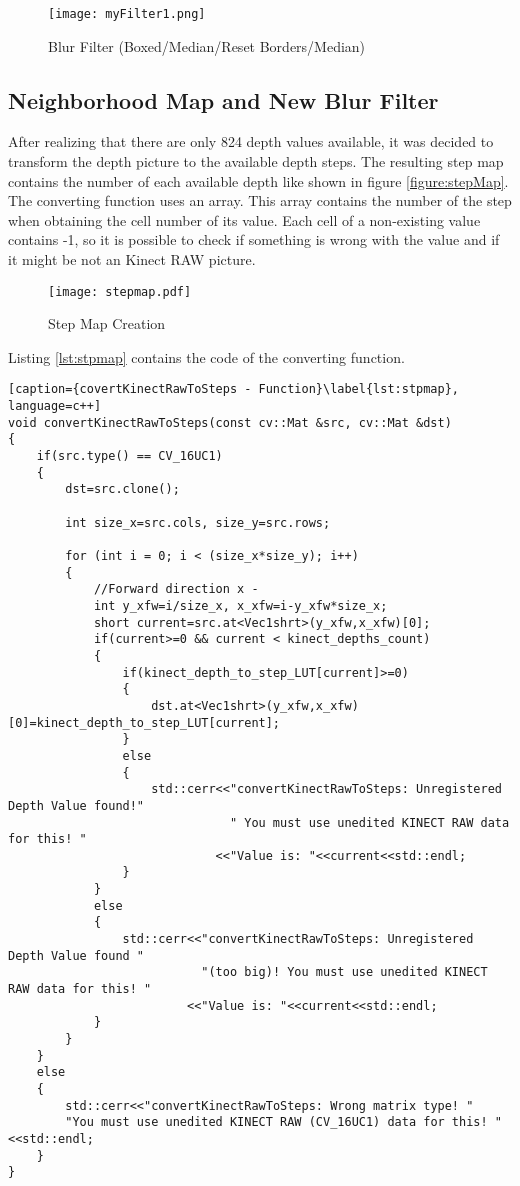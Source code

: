 \begin{figure}[htp]
\begin{center}
  \texttt{[image: myFilter1.png]}
  \caption{Blur Filter (Boxed/Median/Reset Borders/Median)}
  \label{figure:blur}
\end{center}
\end{figure}
\clearpage

\subsection{Neighborhood Map and New Blur Filter} \label{sect:blurFilter} 
After realizing that there are only 824 depth values available, it was decided to transform the depth picture
to the available depth steps. The resulting step map contains the number of each available depth like 
shown in figure \vref{figure:stepMap}. The converting function uses an array. This array contains the number of the
step when obtaining the cell number of its value. Each cell of a non-existing value contains -1, so it is
possible to check if something is wrong with the value and if it might be not an Kinect RAW picture. 

\begin{figure}[htp]
\begin{center}
  \texttt{[image: stepmap.pdf]}
  \caption{Step Map Creation}
  \label{figure:stepMap}
\end{center}
\end{figure}

Listing \vref{lst:stpmap} contains the code of the converting function.

\begin{lstlisting}[caption={covertKinectRawToSteps - Function}\label{lst:stpmap}, language=c++]
void convertKinectRawToSteps(const cv::Mat &src, cv::Mat &dst)
{
	if(src.type() == CV_16UC1)
	{
		dst=src.clone();

		int size_x=src.cols, size_y=src.rows;

		for (int i = 0; i < (size_x*size_y); i++)
		{
			//Forward direction x -
			int y_xfw=i/size_x, x_xfw=i-y_xfw*size_x;
			short current=src.at<Vec1shrt>(y_xfw,x_xfw)[0];
			if(current>=0 && current < kinect_depths_count)
			{
				if(kinect_depth_to_step_LUT[current]>=0)
				{
					dst.at<Vec1shrt>(y_xfw,x_xfw)[0]=kinect_depth_to_step_LUT[current];
				}
				else
				{
					std::cerr<<"convertKinectRawToSteps: Unregistered Depth Value found!" 
					           " You must use unedited KINECT RAW data for this! "
							 <<"Value is: "<<current<<std::endl;
				}
			}
			else
			{
				std::cerr<<"convertKinectRawToSteps: Unregistered Depth Value found " 
				           "(too big)! You must use unedited KINECT RAW data for this! "
						 <<"Value is: "<<current<<std::endl;
			}
		}
	}
	else
	{
		std::cerr<<"convertKinectRawToSteps: Wrong matrix type! "
		"You must use unedited KINECT RAW (CV_16UC1) data for this! "<<std::endl;
	}
}
\end{lstlisting}




